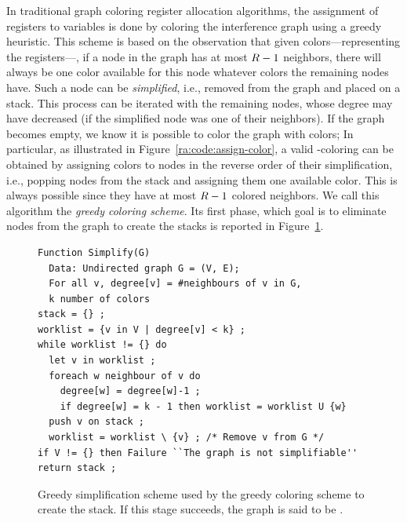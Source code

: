 {In traditional graph coloring register allocation algorithms, the assignment of registers to variables is done by coloring the interference graph using a greedy heuristic.
This scheme is based on the observation that given \regs colors---representing the registers---, if a node in the graph has at most $R-1$ neighbors, there will always be one color available for this node whatever colors the remaining nodes have.
Such a node can be \emph{simplified}, i.e., removed from the graph and placed on a stack.
This process can be iterated with the remaining nodes, whose degree may have decreased (if the simplified node was one of their neighbors).
If the graph becomes empty, we know it is possible to color the graph with \regs colors; 
In particular, as illustrated in Figure~\ref{ra:code:assign-color}, a valid \regs-coloring can be obtained by assigning colors to nodes in the reverse order of their simplification, i.e., popping nodes from the stack and assigning them one available color.
This is always possible since they have at most $R-1$ colored neighbors.
We call this algorithm the \emph{greedy coloring scheme}.
Its first phase, which goal is to eliminate nodes from the graph to create the stacks is reported in Figure~\ref{ra:code:is-k-greedy}.


\begin{figure}
\begin{verbatim}
Function Simplify(G)
  Data: Undirected graph G = (V, E);
  For all v, degree[v] = #neighbours of v in G,
  k number of colors
stack = {} ;
worklist = {v in V | degree[v] < k} ;
while worklist != {} do
  let v in worklist ;
  foreach w neighbour of v do
    degree[w] = degree[w]-1 ;
    if degree[w] = k - 1 then worklist = worklist U {w}
  push v on stack ;
  worklist = worklist \ {v} ; /* Remove v from G */
if V != {} then Failure ``The graph is not simplifiable''
return stack ;
\end{verbatim}
\caption{Greedy simplification scheme used by the greedy coloring scheme to create the stack. If this stage succeeds, the graph is said to be .}
\label{ra:code:is-k-greedy}
\end{figure}


}
